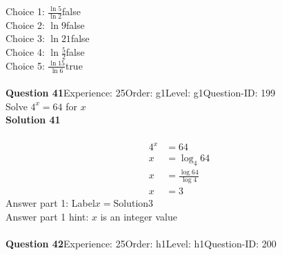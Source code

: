 \documentclass{article}
\begin{document}
Choice 1: \hspace{20pt}$\displaystyle\frac{\ln5}{\ln2}$\hspace{20pt}false\\
Choice 2: \hspace{20pt}$\ln{9}$\hspace{20pt}false\\
Choice 3: \hspace{20pt}$\ln{21}$\hspace{20pt}false\\
Choice 4: \hspace{20pt}$\ln{\displaystyle\frac{5}{2}}$\hspace{20pt}false\\
Choice 5: \hspace{20pt}$\displaystyle\frac{\ln15}{\ln6}$\hspace{20pt}true\\
\\[4pt]
\noindent\textbf{Question 41}\hspace{20pt}Experience: 25\hspace{20pt}Order: g1\hspace{20pt}Level: g1\hspace{20pt}Question-ID: 199\\[2pt]
Solve $4^x=64$ for $x$\\[4pt]
\noindent\textbf{Solution 41}\\[2pt]
\\[-35pt]\begin{align*}
4^x&=64\\[2pt]
x&=\log_{4}64\\[2pt]
x&=\displaystyle\frac{\log64}{\log4}\\[2pt]
x&=3
\end{align*}
Answer part 1: \hspace{10pt}Label\hspace{10pt}$x=$\hspace{10pt}Solution\hspace{10pt}3\\
Answer part 1 hint: \hspace{15pt}$x$ is an integer value\\
\\[4pt]
\noindent\textbf{Question 42}\hspace{20pt}Experience: 25\hspace{20pt}Order: h1\hspace{20pt}Level: h1\hspace{20pt}Question-ID: 200\\[2pt]
\end{document}
